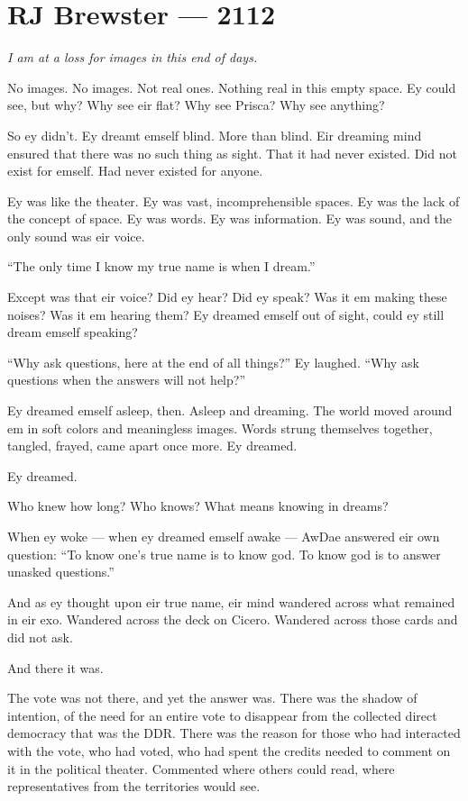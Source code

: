 \hypertarget{rj-brewster-2112}{%
\chapter*{RJ Brewster — 2112}\label{rj-brewster-2112}}

\emph{I am at a loss for images in this end of days.}

No images. No images. Not real ones. Nothing real in this empty space. Ey could see, but why? Why see eir flat? Why see Prisca? Why see anything?

So ey didn't. Ey dreamt emself blind. More than blind. Eir dreaming mind ensured that there was no such thing as sight. That it had never existed. Did not exist for emself. Had never existed for anyone.

Ey was like the theater. Ey was vast, incomprehensible spaces. Ey was the lack of the concept of space. Ey was words. Ey was information. Ey was sound, and the only sound was eir voice.

``The only time I know my true name is when I dream.''

Except was that eir voice? Did ey hear? Did ey speak? Was it em making these noises? Was it em hearing them? Ey dreamed emself out of sight, could ey still dream emself speaking?

``Why ask questions, here at the end of all things?'' Ey laughed. ``Why ask questions when the answers will not help?''

Ey dreamed emself asleep, then. Asleep and dreaming. The world moved around em in soft colors and meaningless images. Words strung themselves together, tangled, frayed, came apart once more. Ey dreamed.

Ey dreamed.

Who knew how long? Who knows? What means knowing in dreams?

When ey woke — when ey dreamed emself awake — AwDae answered eir own question: ``To know one's true name is to know god. To know god is to answer unasked questions.''

And as ey thought upon eir true name, eir mind wandered across what remained in eir exo. Wandered across the deck on Cicero. Wandered across those cards and did not ask.

And there it was.

The vote was not there, and yet the answer was. There was the shadow of intention, of the need for an entire vote to disappear from the collected direct democracy that was the DDR. There was the reason for those who had interacted with the vote, who had voted, who had spent the credits needed to comment on it in the political theater. Commented where others could read, where representatives from the territories would see.

